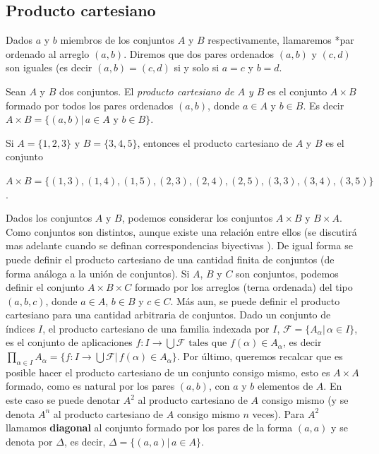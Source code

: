 \documentclass[12pt,]{krantz}
\theoremstyle{definition}
\theoremstyle{definition}
\theoremstyle{definition}
\theoremstyle{remark}
\let\BeginKnitrBlock\begin \let\EndKnitrBlock\end
\begin{document}
\subsection{Producto cartesiano}\label{producto-cartesiano}

\BeginKnitrBlock{definition}
\protect\hypertarget{def:unnamed-chunk-16}{}{\label{def:unnamed-chunk-16}
}Dados \(a\) y \(b\) miembros de los conjuntos \(A\) y \(B\)
respectivamente, llamaremos *par ordenado al arreglo \((a,b)\). Diremos
que dos pares ordenados \((a,b)\) y \((c,d)\) son iguales (es decir
\((a,b)=(c,d)\) si y solo si \(a=c\) y \(b=d\).
\EndKnitrBlock{definition}

\BeginKnitrBlock{definition}
\protect\hypertarget{def:unnamed-chunk-17}{}{\label{def:unnamed-chunk-17}
}Sean \(A\) y \(B\) dos conjuntos. El \emph{producto cartesiano de \(A\)
y \(B\)} es el conjunto \(A\times B\) formado por todos los pares
ordenados \((a,b)\), donde \(a\in A\) y \(b\in B\). Es decir
\(A\times B=\{(a,b)| \, a\in A \mbox{ y } b\in B \}\).
\EndKnitrBlock{definition}

\BeginKnitrBlock{example}
\protect\hypertarget{exm:unnamed-chunk-18}{}{\label{exm:unnamed-chunk-18}
}Si \(A=\{1,2,3\}\) y \(B=\{3,4,5\}\), entonces el producto cartesiano
de \(A\) y \(B\) es el conjunto

\(A\times B=\{ (1,3), (1,4), (1,5), (2,3), (2,4), (2,5), (3,3), (3,4), (3,5)\}\).
\EndKnitrBlock{example}

\BeginKnitrBlock{remark}
{}Dados los conjuntos \(A\) y \(B\), podemos
considerar los conjuntos \(A\times B\) y \(B\times A\). Como conjuntos
son distintos, aunque existe una relación entre ellos (se discutirá mas
adelante cuando se definan correspondencias biyectivas ). De igual forma
se puede definir el producto cartesiano de una cantidad finita de
conjuntos (de forma análoga a la unión de conjuntos). Si \(A\), \(B\) y
\(C\) son conjuntos, podemos definir el conjunto \(A\times B\times C\)
formado por los arreglos (terna ordenada) del tipo \((a,b,c)\), donde
\(a\in A\), \(b\in B\) y \(c\in C\). Más aun, se puede definir el
producto cartesiano para una cantidad arbitraria de conjuntos. Dado un
conjunto de índices \(I\), el producto cartesiano de una familia
indexada por \(I\), \(\mathcal{F}=\{A_{\alpha}|\, \alpha\in I \}\), es
el conjunto de aplicaciones
\(f:I\longrightarrow \bigcup\mathcal{F} \mbox{ tales que } f(\alpha)\in A_{\alpha}\),
es decir
\(\prod_{\alpha \in I} A_{\alpha}=\{f:I\longrightarrow\bigcup \mathcal{F} |\, f(\alpha)\in A_{\alpha} \}\).
Por último, queremos recalcar que es posible hacer el producto
cartesiano de un conjunto consigo mismo, esto es \(A\times A\) formado,
como es natural por los pares \((a,b)\), con \(a\) y \(b\) elementos de
\(A\). En este caso se puede denotar \(A^{2}\) al producto cartesiano de
\(A\) consigo mismo (y se denota \(A^{n}\) al producto cartesiano de
\(A\) consigo mismo \(n\) veces). Para \(A^{2}\) llamamos
\textbf{diagonal} al conjunto formado por los pares de la forma
\((a,a)\) y se denota por \(\Delta\), es decir,
\(\Delta=\{(a,a)|\, a\in A \}\).
\EndKnitrBlock{remark}
\end{document}

